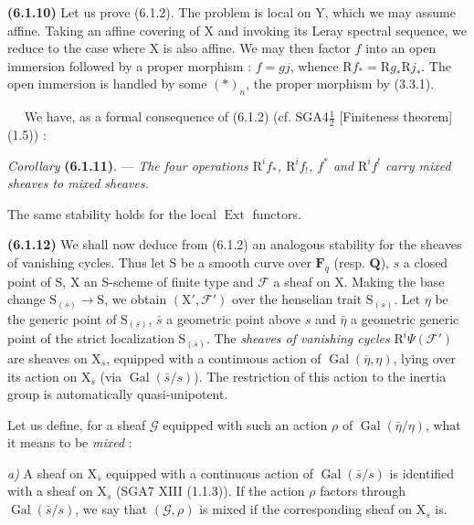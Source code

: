 \documentclass[11pt,leqno]{article}
\newcommand{\Page}[1]{\ifvmode\noindent\else\unskip\ \fi{\footnotesize\textcolor{gray}{[p.\,#1]}}\ \ignorespaces}
\begin{document}
\textbf{(6.1.10)} Let us prove (6.1.2). The problem is local on
\(\mathrm{Y}\), which we may assume affine. Taking an affine
covering of \(\mathrm{X}\) and invoking its Leray spectral sequence,
we reduce to the case where \(\mathrm{X}\) is also affine. We may then
factor \(f\) into an open immersion followed by a proper morphism :
\(f=gj\), whence \(\mathrm{R}f_*=\mathrm{R}g_*\mathrm{R}j_*\).
The open immersion is handled by some \((*)_n\), the proper
morphism by (3.3.1).

\Page{246}
We have, as a formal consequence of (6.1.2)
(cf. SGA4\(\frac{1}{2}\) [Finiteness theorem] (1.5)) :

\textit{Corollary} \textbf{(6.1.11)}. — \textit{The four operations
\(\mathrm{R}^if_*\), \(\mathrm{R}^if_!\), \(f^*\) and
\(\mathrm{R}^if^!\) carry mixed sheaves to mixed sheaves.}

The same stability holds for the local \(\operatorname{Ext}\) functors.

\textbf{(6.1.12)} We shall now deduce from (6.1.2) an
analogous stability for the sheaves of vanishing cycles.
Thus let \(\mathrm{S}\) be a smooth curve over \(\mathbf{F}_q\)
(resp. \(\mathbf{Q}\)), \(s\) a closed point of \(\mathrm{S}\),
\(\mathrm{X}\) an \(\mathrm{S}\)-scheme of finite type and \(\mathscr{F}\)
a sheaf on \(\mathrm{X}\). Making the base change
\(\mathrm{S}_{(s)}\to\mathrm{S}\), we obtain
\((\mathrm{X}',\mathscr{F}')\) over the henselian trait
\(\mathrm{S}_{(s)}\). Let \(\eta\) be the generic point of
\(\mathrm{S}_{(s)}\), \(\bar{s}\) a geometric point above
\(s\) and \(\bar{\eta}\) a geometric generic point of the strict
localization \(\mathrm{S}_{(\bar{s})}\). The \textit{sheaves of vanishing
cycles} \(\mathrm{R}^i\Psi(\mathscr{F}')\) are sheaves
on \(\mathrm{X}_{\bar{s}}\), equipped with a continuous action of
\(\operatorname{Gal}(\bar{\eta},\eta)\), lying over its action on
\(\mathrm{X}_{\bar{s}}\) (via \(\operatorname{Gal}(\bar{s}/s)\)).
The restriction of this action to the inertia group is
automatically quasi-unipotent.

Let us define, for a sheaf \(\mathscr{G}\) equipped with such an
action \(\rho\) of \(\operatorname{Gal}(\bar{\eta}/\eta)\), what it
means to be \textit{mixed} :

\textit{a)} A sheaf on \(\mathrm{X}_{\bar{s}}\) equipped with a continuous
action of \(\operatorname{Gal}(\bar{s}/s)\) is identified with a
sheaf on \(\mathrm{X}_s\) (SGA7 XIII (1.1.3)). If the action
\(\rho\) factors through \(\operatorname{Gal}(\bar{s}/s)\), we say
that \((\mathscr{G},\rho)\) is mixed if the corresponding sheaf
on \(\mathrm{X}_s\) is.
\end{document}
